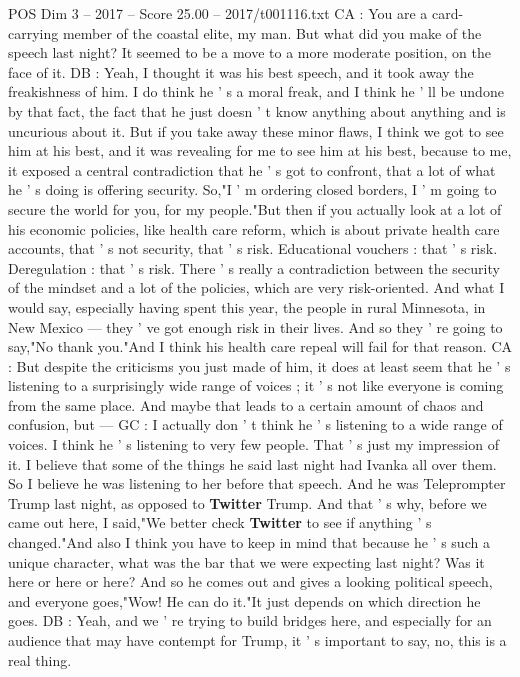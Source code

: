 \begin{textsample}{POS Dim 3 – 2017 – Score 25.00 – 2017/t001116.txt}
CA : You are a card-carrying member of the coastal elite, my man.
But what did you make of the speech last night?
It seemed to be a move to a more moderate position, on the face of it.
DB : Yeah, I thought it was his best speech, and it took away the freakishness of him.
I do think he ' s a moral freak, and I think he ' ll be undone by that fact, the fact that he just doesn ' t know anything about anything and is uncurious about it.
But if you take away these minor flaws, I think we got to see him at his best, and it was revealing for me to see him at his best, because to me, it exposed a central contradiction that he ' s got to confront, that a lot of what he ' s doing is offering security.
So,"I ' m ordering closed borders, I ' m going to secure the world for you, for my people."But then if you actually look at a lot of his economic policies, like health care reform, which is about private health care accounts, that ' s not security, that ' s risk.
Educational vouchers : that ' s risk.
Deregulation : that ' s risk.
There ' s really a contradiction between the security of the mindset and a lot of the policies, which are very risk-oriented.
And what I would say, especially having spent this year, the people in rural Minnesota, in New Mexico — they ' ve got enough risk in their lives.
And so they ' re going to say,"No thank you."And I think his health care repeal will fail for that reason.
CA : But despite the criticisms you just made of him, it does at least seem that he ' s listening to a surprisingly wide range of voices ; it ' s not like everyone is coming from the same place.
And maybe that leads to a certain amount of chaos and confusion, but — GC : I actually don ' t think he ' s listening to a wide range of voices.
I think he ' s listening to very few people.
That ' s just my impression of it.
I believe that some of the things he said last night had Ivanka all over them.
So I believe he was listening to her before that speech.
And he was Teleprompter Trump last night, as opposed to \textbf{Twitter} Trump.
And that ' s why, before we came out here, I said,"We better check \textbf{Twitter} to see if anything ' s changed."And also I think you have to keep in mind that because he ' s such a unique character, what was the bar that we were expecting last night?
Was it here or here or here?
And so he comes out and gives a looking political speech, and everyone goes,"Wow!
He can do it."It just depends on which direction he goes.
DB : Yeah, and we ' re trying to build bridges here, and especially for an audience that may have contempt for Trump, it ' s important to say, no, this is a real thing.

\end{textsample}
